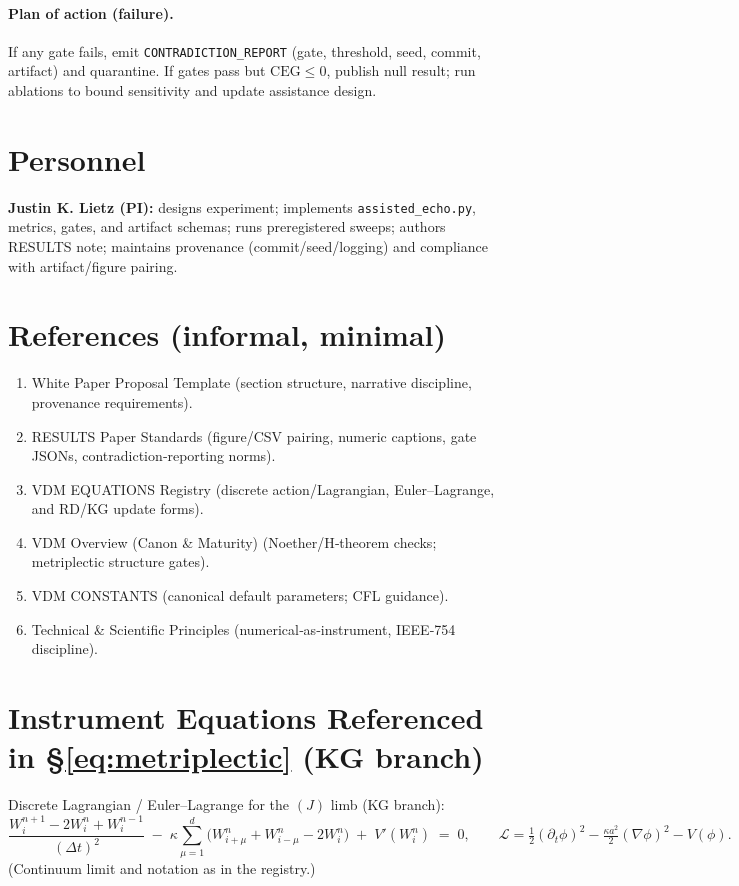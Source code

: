 \documentclass{article}
\begin{document}
\paragraph{Plan of action (failure).}
If any gate fails, emit \texttt{CONTRADICTION\_REPORT} (gate, threshold, seed, commit, artifact) and quarantine. If gates pass but $\mathrm{CEG}\le 0$, publish null result; run ablations to bound sensitivity and update assistance design.

\section{Personnel}
\textbf{Justin K. Lietz (PI):} designs experiment; implements \texttt{assisted\_echo.py}, metrics, gates, and artifact schemas; runs preregistered sweeps; authors RESULTS note; maintains provenance (commit/seed/logging) and compliance with artifact/figure pairing.

\section{References (informal, minimal)}
\begin{enumerate}[leftmargin=1.4em]
  \item White Paper Proposal Template (section structure, narrative discipline, provenance requirements).
  \item RESULTS Paper Standards (figure/CSV pairing, numeric captions, gate JSONs, contradiction‑reporting norms).
  \item VDM EQUATIONS Registry (discrete action/Lagrangian, Euler–Lagrange, and RD/KG update forms).
  \item VDM Overview (Canon \& Maturity) (Noether/H‑theorem checks; metriplectic structure gates).
  \item VDM CONSTANTS (canonical default parameters; CFL guidance).
  \item Technical \& Scientific Principles (numerical‑as‑instrument, IEEE‑754 discipline).
\end{enumerate}

\appendix
\section{Instrument Equations Referenced in \S\ref{eq:metriplectic} (KG branch)}
Discrete Lagrangian / Euler–Lagrange for the $(J)$ limb (KG branch):
\begin{equation*}
\frac{W_i^{n+1}-2W_i^{n}+W_i^{n-1}}{(\Delta t)^2}
\;-\;\kappa \sum_{\mu=1}^d \big(W_{i+\mu}^{n}+W_{i-\mu}^{n}-2W_i^{n}\big)
\;+\; V'(W_i^{n}) \;=\; 0,
\qquad
\mathcal{L} = \tfrac12 (\partial_t \phi)^2 - \tfrac{\kappa a^2}{2} (\nabla \phi)^2 - V(\phi).
\end{equation*}
(Continuum limit and notation as in the registry.)
\end{document}
